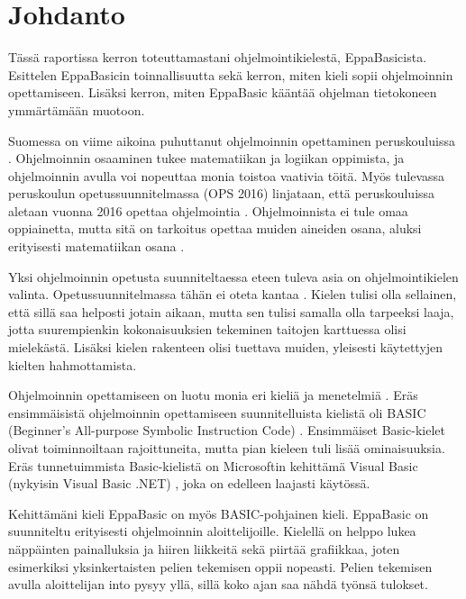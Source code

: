 
\section{Johdanto}
Tässä raportissa kerron toteuttamastani
ohjelmointikielestä, EppaBasicista.
Esittelen EppaBasicin toinnallisuutta
sekä kerron, miten kieli sopii
ohjelmoinnin opettamiseen.
Lisäksi kerron, miten EppaBasic
kääntää ohjelman tietokoneen
ymmärtämään muotoon.

Suomessa on viime aikoina
puhuttanut ohjelmoinnin
opettaminen peruskouluissa
\cite{hs_kiuru}\cite{hs_eka}.
Ohjelmoinnin osaaminen
tukee matematiikan ja logiikan
oppimista, ja ohjelmoinnin
avulla voi nopeuttaa monia
toistoa vaativia töitä.
Myös tulevassa peruskoulun
opetussuunnitelmassa (OPS 2016)
linjataan, että peruskouluissa aletaan
vuonna 2016 opettaa ohjelmointia
\cite{OPS_2016}.
Ohjelmoinnista ei tule omaa oppiainetta,
mutta sitä on tarkoitus opettaa muiden
aineiden osana, aluksi erityisesti
matematiikan osana \cite{OPS_2016}\cite{hs_eka}.

Yksi ohjelmoinnin opetusta suunniteltaessa eteen tuleva
asia on ohjelmointikielen valinta.
Opetussuunnitelmassa tähän ei
oteta kantaa \cite{hs_eka}.
Kielen tulisi olla sellainen,
että sillä saa helposti jotain aikaan,
mutta sen tulisi samalla olla tarpeeksi laaja,
jotta suurempienkin kokonaisuuksien tekeminen
taitojen karttuessa olisi mielekästä.
Lisäksi kielen rakenteen olisi tuettava muiden,
yleisesti käytettyjen kielten hahmottamista.

Ohjelmoinnin opettamiseen
on luotu monia eri kieliä ja menetelmiä
\cite{language_history}.
Eräs ensimmäisistä ohjelmoinnin opettamiseen
suunnitelluista kielistä oli BASIC
(Beginner's All-purpose Symbolic Instruction Code)
\cite{basic}.
Ensimmäiset Basic-kielet olivat toiminnoiltaan rajoittuneita,
mutta pian kieleen tuli lisää ominaisuuksia.
Eräs tunnetuimmista Basic-kielistä on
Microsoftin kehittämä Visual Basic
(nykyisin Visual Basic .NET)
\cite{vb.net},
joka on edelleen laajasti käytössä.

Kehittämäni kieli EppaBasic
on myös
BASIC-pohjainen kieli.
EppaBasic on suunniteltu
erityisesti ohjelmoinnin aloittelijoille.
Kielellä on helppo lukea
näppäinten painalluksia
ja hiiren liikkeitä
sekä piirtää grafiikkaa,
joten esimerkiksi yksinkertaisten
pelien tekemisen oppii nopeasti.
Pelien tekemisen avulla aloittelijan into pysyy yllä,
sillä koko ajan saa nähdä työnsä tulokset.

